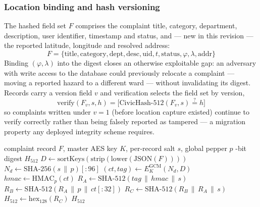 \documentclass[conference]{IEEEtran}
\begin{document}
\subsubsection{Location binding and hash versioning}
The hashed field set $F$ comprises the complaint title, category, department, description, user identifier, timestamp and status, and --- new in this revision --- the reported latitude, longitude and resolved address:
\begin{equation}
F = \{\text{title}, \text{category}, \text{dept}, \text{desc}, \text{uid}, t, \text{status}, \varphi, \lambda, \text{addr}\}
\label{eq:fieldset}
\end{equation}
Binding $(\varphi, \lambda)$ into the digest closes an otherwise exploitable gap: an adversary with write access to the database could previously relocate a complaint --- moving a reported hazard to a different ward --- without invalidating its digest. Records carry a version field $v$ and verification selects the field set by version,
\begin{equation}
\mathrm{verify}(F_v, s, h) = \big[\mathrm{CivicHash}\text{-}512(F_v, s) \overset{?}{=} h\big]
\label{eq:versionverify}
\end{equation}
so complaints written under $v=1$ (before location capture existed) continue to verify correctly rather than being falsely reported as tampered --- a migration property any deployed integrity scheme requires.

\begin{algorithm}[t]
\caption{CivicHash-512 Digest Computation}
\label{alg:civichash}
\begin{algorithmic}[1]
\Require complaint record $F$, master AES key $K$, per-record salt $s$, global pepper $p$
-bit digest $H_{512}$
\State $D \gets \mathrm{sortKeys}(\mathrm{strip}(\mathrm{lower}(\mathrm{JSON}(F))))$ 
\State $N_d \gets \mathrm{SHA\text{-}256}(s \,\|\, p)[:96]$ 
\State $(ct, tag) \gets E^{\mathrm{GCM}}_K(N_d, D)$ 
\State $hmac \gets \mathrm{HMAC}_p(ct)$ 
\State $R_A \gets \mathrm{SHA\text{-}512}(tag \,\|\, hmac \,\|\, s)$ 
\State $R_B \gets \mathrm{SHA\text{-}512}(R_A \,\|\, p \,\|\, ct[:32])$ 
\State $R_C \gets \mathrm{SHA\text{-}512}(R_B \,\|\, R_A \,\|\, s)$ 
\State $H_{512} \gets \mathrm{hex}_{128}(R_C)$ 
\State \Return $H_{512}$
\end{algorithmic}
\end{algorithm}
\end{document}
